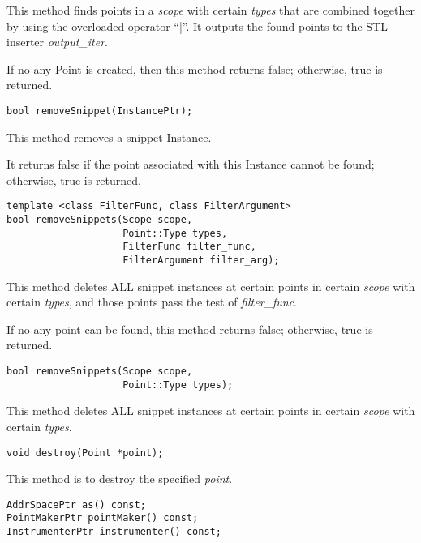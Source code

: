 This method finds points in a \emph{scope} with certain \emph{types} that are combined
together by using the overloaded operator ``|''. It outputs the found points to
the STL inserter \emph{output\_iter}.

If no any Point is created, then this method returns false; otherwise, true is
returned.


\begin{verbatim}
bool removeSnippet(InstancePtr);

\end{verbatim}



This method removes a snippet Instance.

It returns false if the point associated with this Instance cannot be found;
otherwise, true is returned.


\begin{verbatim}
template <class FilterFunc, class FilterArgument>
bool removeSnippets(Scope scope,
                    Point::Type types,
                    FilterFunc filter_func,
                    FilterArgument filter_arg);

\end{verbatim}



This method deletes ALL snippet instances at certain points in certain \emph{scope}
with certain \emph{types}, and those points pass the test of \emph{filter\_func}.

If no any point can be found, this method returns false; otherwise, true is
returned.


\begin{verbatim}
bool removeSnippets(Scope scope,
                    Point::Type types);

\end{verbatim}



This method deletes ALL snippet instances at certain points in certain \emph{scope}
with certain \emph{types}.


\begin{verbatim}
void destroy(Point *point);

\end{verbatim}



This method is to destroy the specified \emph{point}.


\begin{verbatim}
AddrSpacePtr as() const;
PointMakerPtr pointMaker() const;
InstrumenterPtr instrumenter() const;

\end{verbatim}



